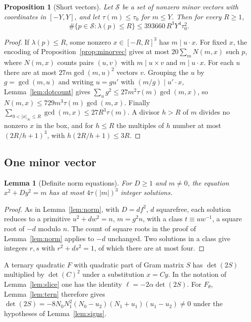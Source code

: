 \documentclass[11pt]{amsart}
\newtheorem{lemma}[theorem]{Lemma}
\newtheorem{proposition}[theorem]{Proposition}
\theoremstyle{definition}
\theoremstyle{remark}
\begin{document}
\begin{proposition}[Short vectors]\label{prop:short}
Let $\mathcal S$ be a set of nonzero minor vectors with coordinates in $[-Y,Y]$, and let
$\tau(m)\le\tau_0$ for $m\le Y$. Then for every $R\ge1$,
\[
\#\{p\in\mathcal S:\lambda(p)\le R\}\le393660\,R^3Y^4\tau_0^2 .
\]
\end{proposition}

\begin{proof}
If $\lambda(p)\le R$, some nonzero $x\in[-R,R]^3$ has $m\mid u\cdot x$. For fixed $x$, the
encoding of Proposition~\ref{prop:minorvec} gives at most $20\sum_m N(m,x)$ such $p$, where
$N(m,x)$ counts pairs $(u,v)$ with $m\mid u\times v$ and $m\mid u\cdot x$. For each $u$ there
are at most $27m\gcd(m,u)^2$ vectors $v$. Grouping the $u$ by $g=\gcd(m,u)$ and writing
$u=gu'$ with $(m/g)\mid u'\cdot x$, Lemma~\ref{lem:dotcount} gives
$\sum_ug^2\le27m^2\tau(m)\gcd(m,x)$, so $N(m,x)\le729m^3\tau(m)\gcd(m,x)$. Finally
$\sum_{0<|x|_\infty\le R}\gcd(m,x)\le27R^3\tau(m)$. A divisor $h>R$ of $m$ divides no nonzero
$x$ in the box, and for $h\le R$ the multiples of $h$ number at most $(2R/h+1)^3$, with
$h(2R/h+1)\le3R$.
\end{proof}

\subsection{One minor vector}

\begin{lemma}[Definite norm equations]\label{lem:defnorm}
For $D\ge1$ and $m\ne0$, the equation $x^2+Dy^2=m$ has at most $4\tau(|m|)^3$ integer
solutions.
\end{lemma}

\begin{proof}
As in Lemma~\ref{lem:norm}, with $D=df^2$, $d$ squarefree, each solution reduces to a primitive
$u^2+dw^2=n$, $m=g^2n$, with a class $t\equiv uw^{-1}$, a square root of $-d$ modulo $n$. The
count of square roots in the proof of Lemma~\ref{lem:norm} applies to $-d$ unchanged. Two
solutions in a class give integers $r,s$ with $r^2+ds^2=1$, of which there are at most four.
\end{proof}

A ternary quadratic $F$ with quadratic part of Gram matrix $S$ has $\det(2S)$ multiplied by
$\det(C)^2$ under a substitution $x=Cy$. In the notation of Lemma~\ref{lem:slice} one has the
identity $\ell=-2\alpha\det(2S)$. For $F_\theta$, Lemma~\ref{lem:tern} therefore gives
$\det(2S)=-8N_0N_1^2(N_0-u_2)(N_1+u_1)(u_1-u_2)\ne0$ under the hypotheses of Lemma~\ref{lem:signs}.
\end{document}
